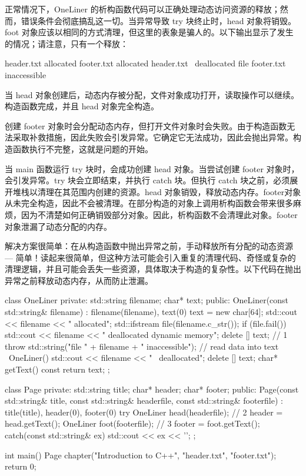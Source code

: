 正常情况下，OneLiner 的析构函数代码可以正确处理动态访问资源的释放；然而，错误条件会彻底搞乱这一切。当异常导致 try 块终止时，head 对象将销毁。foot 对象应该以相同的方式清理，但这里的表象是骗人的。以下输出显示了发生的情况；请注意，只有一个释放：

\begin{shell}
header.txt allocated
footer.txt allocated
header.txt ~deallocated
file footer.txt inaccessible
\end{shell}


当 head 对象创建后，动态内存被分配，文件对象成功打开，读取操作可以继续。构造函数完成，并且 head 对象完全构造。

创建 footer 对象时会分配动态内存，但打开文件对象时会失败。由于构造函数无法采取补救措施，因此失败会引发异常。它确定它无法成功，因此会抛出异常。构造函数执行不完整，这就是问题的开始。

当 main 函数运行 try 块时，会成功创建 head 对象。当尝试创建 footer 对象时，会引发异常。try 块会立即结束，并执行 catch 块。但执行 catch 块之前，必须展开堆栈以清理在其范围内创建的资源。head 对象销毁，释放动态内存。footer对象从未完全构造，因此不会被清理。在部分构造的对象上调用析构函数会带来很多麻烦，因为不清楚如何正确销毁部分对象。因此，析构函数不会清理此对象。footer 对象泄漏了动态分配的内存。


解决方案很简单：在从构造函数中抛出异常之前，手动释放所有分配的动态资源 — 简单！读起来很简单，但这种方法可能会引入重复的清理代码、奇怪或复杂的清理逻辑，并且可能会丢失一些资源，具体取决于构造的复杂性。以下代码在抛出异常之前释放动态内存，从而防止泄漏。


\begin{cpp}
class OneLiner {
private:
  std::string filename;
  char* text;
public:
  OneLiner(const std::string& filename) : filename(filename), text(0) {
    text = new char[64];
    std::cout << filename << " allocated\n";
    std::ifstream file(filename.c_str());
    if (file.fail()) {
      std::cout << filename << " deallocated dynamic memory\n";
      delete [] text; // 1
      throw std::string("file " + filename + " inaccessible");
    }
    // read data into text
  }
  ~OneLiner() {
    std::cout << filename << " ~deallocated\n";
    delete [] text;
  }
  char* getText() const { return text; }
};

class Page {
private:
  std::string title;
  char* header;
  char* footer;
public:
  Page(const std::string& title, const std::string& headerfile, const
  std::string& footerfile) :
      title(title), header(0), footer(0) {
    try {
      OneLiner head(headerfile); // 2
      header = head.getText();
      OneLiner foot(footerfile); // 3
      footer = foot.getText();
    } catch(const std::string& ex) {
      std::cout << ex << '\n';
    }
  }
};

int main() {
  Page chapter("Introduction to C++", "header.txt", "footer.txt");
  return 0;
}
\end{cpp}

